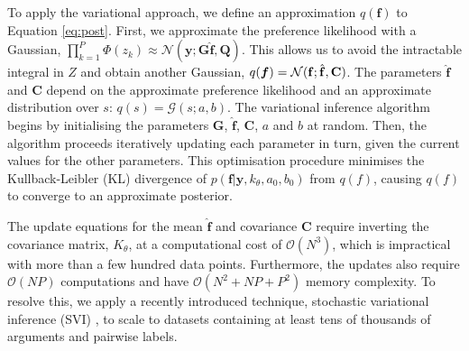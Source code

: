 To apply the variational approach, we define an approximation $q(\mathbf f)$ to Equation \ref{eq:post}. 
First, we approximate the preference likelihood with a Gaussian, $\prod_{k=1}^P \Phi\left( z_k \right) \approx \mathcal{N}(\mathbf y; \mathbf G\hat{\mathbf f}, \mathbf Q)$. This allows us to avoid the intractable integral in $Z$ and obtain another Gaussian, $q(\boldsymbol f) = \mathcal{N}(\mathbf f; \hat{\mathbf f}, \mathbf C)$. 
The parameters $\hat{\mathbf f}$ and $\mathbf C$ 
depend on the approximate preference likelihood 
and an approximate distribution over $s$: $q(s) = \mathcal{G}(s; a, b)$. 
The variational inference algorithm begins by initialising the parameters $\mathbf G$, $ \hat{\mathbf f}$, $\mathbf C$, $a$ and $b$ at random. Then, the  algorithm proceeds iteratively updating each parameter in turn, given the current values for the other parameters. 
This optimisation procedure minimises the Kullback-Leibler (KL) divergence of $p(\mathbf f |\mathbf y, k_{\theta}, a_0, b_0)$ from $q(f)$, causing $q(f)$ to converge to an approximate posterior. 

The update equations for the mean $\hat{\mathbf f}$ and covariance $\mathbf C$ require inverting the covariance matrix, $K_{\theta}$, at a computational cost of $\mathcal{O}(N^3)$, which is impractical with more than a few hundred data points. 
Furthermore, the updates also require $\mathcal{O}(NP)$ computations and
have $\mathcal{O}(N^2 + NP + P^2)$ memory complexity.
To resolve this, 
we apply a recently introduced technique, stochastic variational inference (SVI) 
\cite{hoffman2013stochastic,hensman_scalable_2015},
to scale to datasets containing at least tens of thousands of arguments and pairwise labels.

